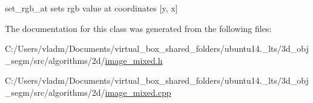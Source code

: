 set\+\_\+rgb\+\_\+at sets rgb value at coordinates \mbox{[}y, x\mbox{]} 



The documentation for this class was generated from the following files\+:\begin{DoxyCompactItemize}
\item 
C\+:/\+Users/vladm/\+Documents/virtual\+\_\+box\+\_\+shared\+\_\+folders/ubuntu14.\+\_\+lts/3d\+\_\+obj\+\_\+segm/src/algorithms/2d/\hyperlink{image__mixed_8h}{image\+\_\+mixed.\+h}\item 
C\+:/\+Users/vladm/\+Documents/virtual\+\_\+box\+\_\+shared\+\_\+folders/ubuntu14.\+\_\+lts/3d\+\_\+obj\+\_\+segm/src/algorithms/2d/\hyperlink{image__mixed_8cpp}{image\+\_\+mixed.\+cpp}\end{DoxyCompactItemize}
